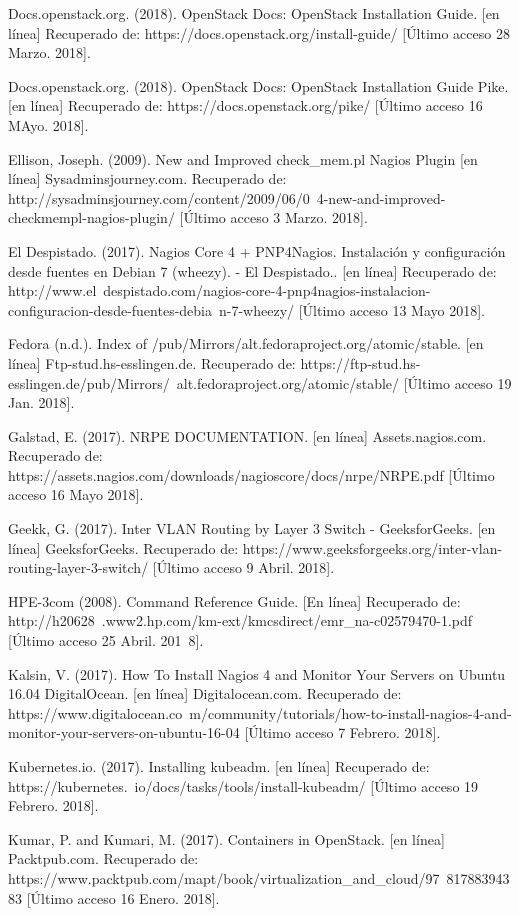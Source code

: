 Docs.openstack.org. (2018). OpenStack Docs: OpenStack Installation Guide. [en línea] Recuperado de: https://docs.openstack.org/install-guide/ [Último acceso 28 Marzo. 2018].

Docs.openstack.org. (2018). OpenStack Docs: OpenStack Installation Guide Pike. [en línea] Recuperado de: https://docs.openstack.org/pike/ [Último acceso 16 MAyo. 2018].

Ellison, Joseph. (2009). New and Improved check\_mem.pl Nagios Plugin  [en línea] Sysadminsjourney.com. Recuperado de: http://sysadminsjourney.com/content/2009/06/0\ 4-\/new-and-improved-checkmempl-nagios-plugin/ [Último acceso 3 Marzo. 2018].    

El Despistado. (2017). Nagios Core 4 + PNP4Nagios. Instalación y configuración desde fuentes en Debian 7 (wheezy). - El Despistado.. [en línea] Recuperado de: http://www.el\ despistado.com/nagios-core-4-pnp4nagios-instalacion-configuracion-desde-fuentes-debia\ n-7-wheezy/ [Último acceso 13 Mayo 2018].

Fedora (n.d.). Index of /pub/Mirrors/alt.fedoraproject.org/atomic/stable. [en línea] Ftp-stud.hs-esslingen.de. Recuperado de: https://ftp-stud.hs-esslingen.de/pub/Mirrors/\ alt.fedoraproject.org/atomic/stable/ [Último acceso 19 Jan. 2018].

Galstad, E. (2017). NRPE DOCUMENTATION. [en línea] Assets.nagios.com. Recuperado de: https://assets.nagios.com/downloads/nagioscore/docs/nrpe/NRPE.pdf [Último acceso 16 Mayo 2018].

Geekk, G. (2017). Inter VLAN Routing by Layer 3 Switch - GeeksforGeeks. [en línea] GeeksforGeeks. Recuperado de: https://www.geeksforgeeks.org/inter-vlan-routing-layer-3-switch/ [Último acceso 9 Abril. 2018].

HPE-3com (2008). Command Reference Guide. [En línea] Recuperado de: http://h20628\ .www2.hp.com/km-ext/kmcsdirect/emr\_na-c02579470-1.pdf [Último acceso 25 Abril. 201\ 8].

Kalsin, V. (2017). How To Install Nagios 4 and Monitor Your Servers on Ubuntu 16.04  DigitalOcean. [en línea] Digitalocean.com. Recuperado de: https://www.digitalocean.co\ m/community/tutorials/how-to-install-nagios-4-and-monitor-your-servers-on-ubuntu-16-04 [Último acceso 7 Febrero. 2018].

Kubernetes.io. (2017). Installing kubeadm. [en línea] Recuperado de: https://kubernetes.\ io/docs/tasks/tools/install-kubeadm/ [Último acceso 19 Febrero. 2018].

Kumar, P. and Kumari, M. (2017). Containers in OpenStack. [en línea] Packtpub.com. Recuperado de: https://www.packtpub.com/mapt/book/virtualization\_and\_cloud/97\ 81788394383 [Último acceso 16 Enero. 2018].

